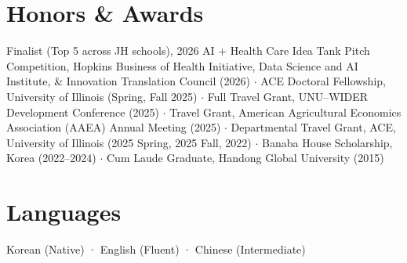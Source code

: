 \documentclass[a4paper,11pt]{article}
\begin{document}
\section{\textbf{Honors \& Awards}}
\vspace{-0.4mm}

Finalist (Top 5 across JH schools), 2026 AI + Health Care Idea Tank Pitch Competition, Hopkins Business of Health Initiative, Data Science and AI Institute, \& Innovation Translation Council (2026) $\cdot$  
ACE Doctoral Fellowship, University of Illinois (Spring, Fall 2025) $\cdot$  
Full Travel Grant, UNU–WIDER Development Conference (2025) $\cdot$  
Travel Grant, American Agricultural Economics Association (AAEA) Annual Meeting (2025) $\cdot$  
Departmental Travel Grant, ACE, University of Illinois (2025 Spring, 2025 Fall, 2022) $\cdot$  
Banaba House Scholarship, Korea (2022–2024) $\cdot$  
Cum Laude Graduate, Handong Global University (2015)


\section{\textbf{Languages}}
Korean (Native) · English (Fluent) · Chinese (Intermediate)
\end{document}
